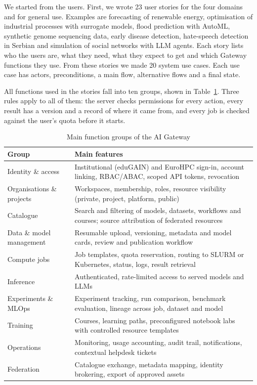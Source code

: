 \documentclass[conference,a4paper]{IEEEtran}
\begin{document}
We started from the users. First, we wrote 23 user stories for the four domains and for general use. Examples are forecasting of renewable energy, optimisation of industrial processes with surrogate models, flood prediction with AutoML, synthetic genome sequencing data, early disease detection, hate-speech detection in Serbian and simulation of social networks with LLM agents. Each story lists who the users are, what they need, what they expect to get and which Gateway functions they use. From these stories we made 20 system use cases. Each use case has actors, preconditions, a main flow, alternative flows and a final state.

All functions used in the stories fall into ten groups, shown in Table~\ref{tab:func}. Three rules apply to all of them: the server checks permissions for every action, every result has a version and a record of where it came from, and every job is checked against the user's quota before it starts.

\begin{table}[t]
\centering
\caption{Main function groups of the AI Gateway}
\label{tab:func}
\footnotesize
\renewcommand{\arraystretch}{1.1}
\begin{tabular}{@{}p{2.1cm}p{5.9cm}@{}}
\toprule
\textbf{Group} & \textbf{Main features} \\
\midrule
Identity \& access & Institutional (eduGAIN) and EuroHPC sign-in, account linking, RBAC/ABAC, scoped API tokens, revocation \\
Organisations \& projects & Workspaces, membership, roles, resource visibility (private, project, platform, public) \\
Catalogue & Search and filtering of models, datasets, workflows and courses; source attribution of federated resources \\
Data \& model management & Resumable upload, versioning, metadata and model cards, review and publication workflow \\
Compute jobs & Job templates, quota reservation, routing to SLURM or Kubernetes, status, logs, result retrieval \\
Inference & Authenticated, rate-limited access to served models and LLMs \\
Experiments \& MLOps & Experiment tracking, run comparison, benchmark evaluation, lineage across job, dataset and model \\
Training & Courses, learning paths, preconfigured notebook labs with controlled resource templates \\
Operations & Monitoring, usage accounting, audit trail, notifications, contextual helpdesk tickets \\
Federation & Catalogue exchange, metadata mapping, identity brokering, export of approved assets \\
\bottomrule
\end{tabular}
\end{table}
\end{document}
